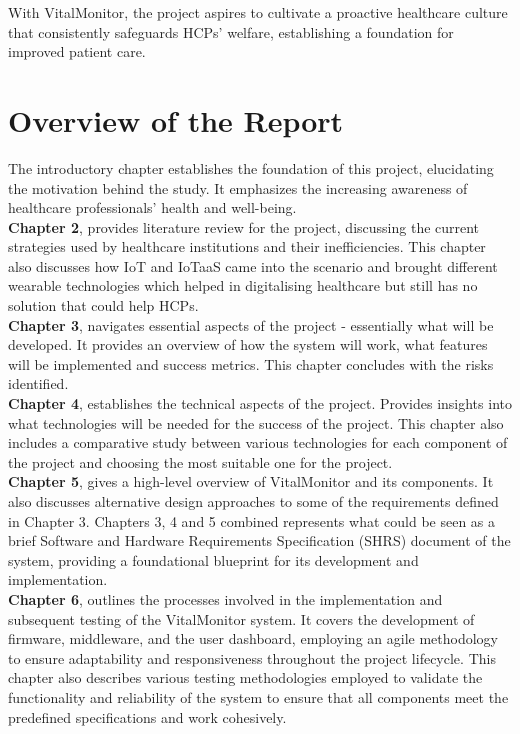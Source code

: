 \noindent With VitalMonitor, the project aspires to cultivate a proactive healthcare culture that consistently safeguards HCPs' welfare, establishing a foundation for improved patient care.


\section{Overview of the Report}
The introductory chapter establishes the foundation of this project, elucidating the motivation behind the study. It emphasizes the increasing awareness of healthcare professionals’ health and well-being. \\

\noindent\textbf{Chapter 2}, provides literature review for the project, discussing the current strategies used by healthcare institutions and their inefficiencies. This chapter also discusses how IoT and IoTaaS came into the scenario and brought different wearable technologies which helped in digitalising healthcare but still has no solution that could help HCPs. \\

\noindent\textbf{Chapter 3},  navigates essential aspects of the project - essentially what will be developed. It provides an overview of how the system will work, what features will be implemented and success metrics. This chapter concludes with the risks identified. \\

\noindent\textbf{Chapter 4},  establishes the technical aspects of the project. Provides insights into what technologies will be needed for the success of the project. This chapter also includes a comparative study between various technologies for each component of the project and choosing the most suitable one for the project. \\

\noindent\textbf{Chapter 5}, gives a high-level overview of VitalMonitor and its components. It also discusses alternative 
design approaches to some of the requirements defined in Chapter 3. Chapters 3, 4 and 5 combined represents what could be seen as a brief Software and Hardware Requirements Specification (SHRS) document of the system, providing a foundational blueprint for its development and implementation. \\

\noindent\textbf{Chapter 6}, outlines the processes involved in the implementation and subsequent testing of the VitalMonitor system. It covers the development of firmware, middleware, and the user dashboard, employing an agile methodology to ensure adaptability and responsiveness throughout the project lifecycle. This chapter also describes various testing methodologies employed to validate the functionality and reliability of the system to ensure that all components meet the predefined specifications and work cohesively.\\


